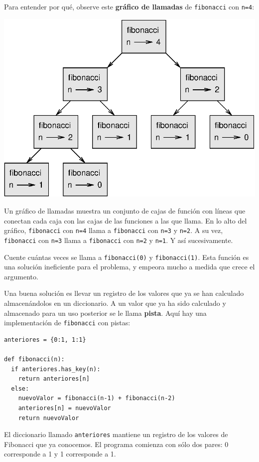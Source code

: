 Para entender por qué, observe este \textbf{gráfico de llamadas} de
\texttt{fibonacci} con \texttt{n=4}:

\beforefig \centerline{\includegraphics{illustrations/fibonacci}}
\afterfig

Un gráfico de llamadas muestra un conjunto de cajas de función con
líneas que conectan cada caja con las cajas de las funciones a las
que llama. En lo alto del gráfico, \texttt{fibonacci} con \texttt{n=4}
llama a \texttt{fibonacci} con \texttt{n=3} y \texttt{n=2}. A su vez,
\texttt{fibonacci} con \texttt{n=3} llama a \texttt{fibonacci} con
\texttt{n=2} y \texttt{n=1}. Y así sucesivamente.

  

Cuente cuántas veces se llama a \texttt{fibonacci(0)} y \texttt{fibonacci(1)}.
Esta función es una solución ineficiente para el problema, y empeora
mucho a medida que crece el argumento.

Una buena solución es llevar un registro de los valores que ya se
han calculado almacenándolos en un diccionario. A un valor que ya
ha sido calculado y almacenado para un uso posterior se le llama \textbf{pista}.
Aquí hay una implementación de \texttt{fibonacci} con pistas:
\begin{verbatim}
anteriores = {0:1, 1:1}

def fibonacci(n):
  if anteriores.has_key(n):
    return anteriores[n]
  else:
    nuevoValor = fibonacci(n-1) + fibonacci(n-2)
    anteriores[n] = nuevoValor
    return nuevoValor
\end{verbatim}

El diccionario llamado \texttt{anteriores} mantiene un registro de
los valores de Fibonacci que ya conocemos. El programa comienza con
sólo dos pares: 0 corresponde a 1 y 1 corresponde a 1.

